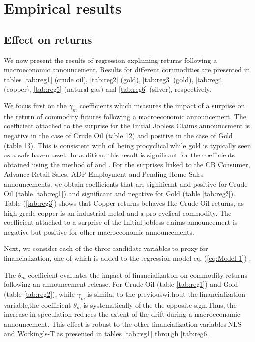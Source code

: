 \documentclass[12pt]{article}
\begin{document}
\section{Empirical results} \label{sec:result}

\subsection{Effect on returns}
We now present the results of regression explaining returns following a macroeconomic announcement. Results for different commodities are presented in tables \ref{tab:reg1} (crude oil), \ref{tab:reg2} (gold), \ref{tab:reg3} (gold), \ref{tab:reg4} (copper), \ref{tab:reg5} (natural gas) and \ref{tab:reg6} (silver), respectively.

We focus first on the $\gamma_m$ coefficients which measures the impact of a surprise on the return of commodity futures following a macroeconomic announcement. The coefficient attached to the surprise for the Initial Jobless Claims announcement is negative in the case of Crude Oil (table 12) and positive in the case of Gold (table 13). This is consistent with oil being procyclical while gold is typically seen as a safe haven asset.  In addition, this result is significant for the coefficients obtained using the method of \citet{kurov2019price} and \citet{andersen2007real}. For the surprises linked to the CB Consumer, Advance Retail Sales, ADP Employment and Pending Home Sales announcements, we obtain coefficients that are significant and positive for Crude Oil (table \ref{tab:reg1}) and significant and negative for Gold (table \ref{tab:reg2}). Table (\ref{tab:reg3})  shows that Copper returns behaves like Crude Oil returns, as high-grade copper is an industrial metal and a pro-cyclical commodity. The coefficient attached to a surprise of the Initial jobless claims announcement is negative but positive for other macroeconomic announcements. 

Next, we consider each of the three candidate variables to proxy for financialization, one of which is added to the regression model eq. (\ref{eq:Model 1}) . 

The $\theta_m$ coefficient evaluates the impact of financialization on commodity returns following an announcement release. For Crude Oil (table \ref{tab:reg1}) and Gold (table \ref{tab:reg2}), while $\gamma_m$ is similar to the previouswithout the financialization variable,the coefficient $\theta_m$ is systematically of the the opposite sign.Thus, the increase in speculation reduces the extent of the drift during a macroeconomic announcement. This effect is robust to the other financialization variables NLS and Working’s-T as presented in tables \ref{tab:reg1} through \ref{tab:reg6}.
\end{document}
